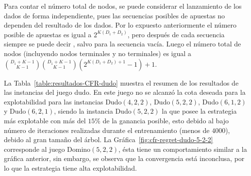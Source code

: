 Para contar el número total de nodos, se puede considerar el lanzamiento de los dados de forma independiente, pues las secuencias posibles de apuestas no dependen del resultado de los dados. Por lo expuesto anteriormente el número posible de apuestas es igual a $2^{K(D_1+D_2)}$, pero después de cada secuencia siempre se puede decir , salvo para la secuencia vacía. Luego el número total de nodos (incluyendo nodos terminales y no terminales) es igual a $\binom{D_1+K-1}{K-1}\binom{D_1+K-1}{K-1}(2^{K(D_1+D_2)+1}-1)+1$.

La Tabla~\ref{table:resultados-CFR-dudo} muestra el resumen de los resultados de las instancias del juego dudo. En este juego no se alcanzó la cota deseada para la explotabilidad para las instancias Dudo$(4, 2, 2)$, Dudo$(5, 2, 2)$, Dudo$(6, 1, 2)$ y Dudo$(6, 2, 1)$, siendo la instancia Dudo$(5, 2, 2)$ la que posee la estrategia más explotable con más del $15\%$ de la ganancia posible, esto debido al bajo número de iteraciones realizadas durante el entrenamiento (menos de $4000$), debido al gran tamaño del árbol. La Gráfica~\ref{fig:cfr-regret-dudo-5-2-2} corresponde al juego Domino$(5, 2, 2)$, ésta tiene un comportamiento similar a la gráfica anterior, sin embargo, se observa que la convergencia está inconclusa, por lo que la estrategia tiene alta explotabilidad.


